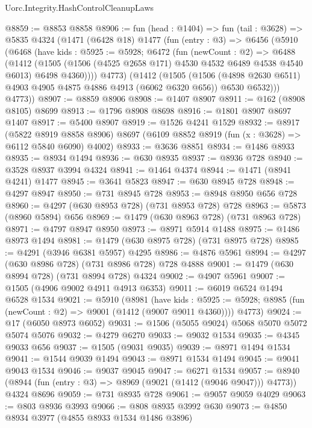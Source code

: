 \begin{lexlean}{Uorc.Integrity.HashControlCleanupLaws}
\begin{coremodule}
@8859 := @8853 @8858
@8906 := fun (head : @1404) =>
  fun (tail : @3628) =>
  @5835
    @4324
    (@1471
      (@6428 @18)
      @1477
      (fun (entry : @3) =>
      @6456
        (@5910
          (@6468
            (have kids : @5925 := @5928;
            @6472
              (fun (newCount : @2) =>
              @6488
                (@1412
                  (@1505
                    (@1506 (@4525 @2658 @171) @4530 @4532 @6489 @4538 @4540 @6013)
                    @6498
                    @4360))))
            @4773)
          (@1412
            (@1505
              (@1506 (@4898 @2630 @6511) @4903 @4905 @4875 @4886 @4913 (@6062 @6320 @656))
              @6530
              @6532)))
        @4773))
@8907 := @8859 @8906
@8908 := @1407 @8907
@8911 := @162 (@8908 @8105) @8699
@8913 := @1796 @8908 @8698
@8916 := @1801 @8907 @8697 @1407
@8917 := @5400 @8907
@8919 := @1526 @4241 @1529
@8932 := @8917
    (@5822 @8919 @8858 @8906)
    @8697
    (@6109 @8852 @8919 (fun (x : @3628) => @6112 @5840 @6090) @4002)
@8933 := @3636 @8851
@8934 := @1486 @8933
@8935 := @8934 @1494
@8936 := @630 @8935
@8937 := @8936 @728
@8940 := @3528 @8937 @3994 @4324
@8941 := @1464 @4374
@8944 := @1471 (@8941 @4241) @1477
@8945 := @3641 @5823
@8947 := @630 @8945 @728
@8948 := @4297 @8947
@8950 := @731 @8945 @728
@8953 := @8948 @8950 @656 @728
@8960 := @4297 (@630 @8953 @728) (@731 @8953 @728) @728
@8963 := @5873 (@8960 @5894) @656
@8969 := @1479 (@630 @8963 @728) (@731 @8963 @728)
@8971 := @4797 @8947 @8950
@8973 := @8971 @5914 @1488
@8975 := @1486 @8973 @1494
@8981 := @1479 (@630 @8975 @728) (@731 @8975 @728)
@8985 := @4291 (@3946 @6381 @5957) @4295
@8986 := @4876 @5961
@8994 := @4297 (@630 @8986 @728) (@731 @8986 @728) @728 @4888
@9001 := @1479 (@630 @8994 @728) (@731 @8994 @728) @4324
@9002 := @4907 @5961
@9007 := @1505 (@4906 @9002 @4911 @4913 @6353)
@9011 := @6019 @6524 @1494 @6528 @1534
@9021 := @5910
    (@8981
      (have kids : @5925 := @5928; @8985 (fun (newCount : @2) => @9001 (@1412 (@9007 @9011 @4360))))
      @4773)
@9024 := @17 (@6050 @8973 @6052)
@9031 := @1506 (@5055 @9024) @5068 @5070 @5072 @5074 @5076
@9032 := @4279 @6270
@9033 := @9032 @1534
@9035 := @4345 @9033 @656
@9037 := @1505 (@9031 @9035)
@9039 := @8971 @1494 @1534
@9041 := @1544 @9039 @1494
@9043 := @8971 @1534 @1494
@9045 := @9041 @9043 @1534
@9046 := @9037 @9045
@9047 := @6271 @1534
@9057 := @8940 (@8944 (fun (entry : @3) => @8969 (@9021 (@1412 (@9046 @9047))) @4773)) @4324 @8696
@9059 := @731 @8935 @728
@9061 := @9057 @9059 @4029
@9063 := @803 @8936 @3993
@9066 := @808 @8935 @3992 @630
@9073 := @4850 @8934 @3977 (@4855 @8933 @1534 @1486 @3896)

\end{coremodule}
\end{lexlean}

